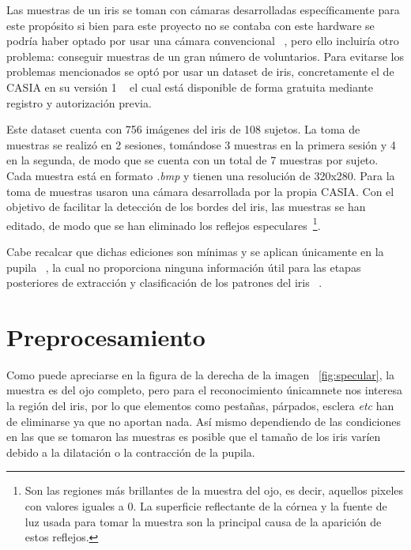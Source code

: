 Las muestras de un iris se toman con cámaras desarrolladas específicamente para este propósito si bien para este proyecto no se contaba con este hardware se podría haber optado por usar una cámara convencional ~\cite{sanbishig:2017}, pero ello incluiría otro problema: conseguir muestras de un gran número de voluntarios.
Para evitarse los problemas mencionados se optó por usar un dataset de iris, concretamente el de CASIA en su versión 1 ~\cite{casia:1} el cual está disponible de forma gratuita mediante registro y autorización previa.

Este dataset cuenta con 756 imágenes del iris de 108 sujetos. La toma de muestras se realizó en 2 sesiones, tomándose 3 muestras en la primera sesión y 4 en la segunda, de modo que se cuenta con un total de 7 muestras por sujeto.
Cada muestra está en formato \emph{.bmp} y tienen una resolución de 320x280.
Para la toma de muestras usaron una cámara desarrollada por la propia CASIA.
Con el objetivo de facilitar la detección de los bordes del iris, las muestras se han editado, de modo que se han eliminado los reflejos especulares~\footnote{Son las regiones más brillantes de la muestra del ojo, es decir, aquellos pixeles con valores iguales a 0. La superficie reflectante de la córnea y la fuente de luz usada para tomar la muestra son la principal causa de la aparición de estos reflejos.}.

Cabe recalcar que dichas ediciones son mínimas y se aplican únicamente en la pupila ~\cite{kumar:2019}, la cual no proporciona ninguna información útil para las etapas posteriores de extracción y clasificación de los patrones del iris ~\cite{bowyer:2008}.

\section{Preprocesamiento} \label{prepro}
Como puede apreciarse en la figura de la derecha de la imagen ~\ref{fig:specular}, la muestra es del ojo completo, pero para el reconocimiento únicamnete nos interesa la región del iris, por lo que elementos como pestañas, párpados, esclera \emph{etc} han de eliminarse ya que no aportan nada.
Así mismo dependiendo de las condiciones en las que se tomaron las muestras es posible que el tamaño de los iris varíen debido a la dilatación o la contracción de la pupila.

